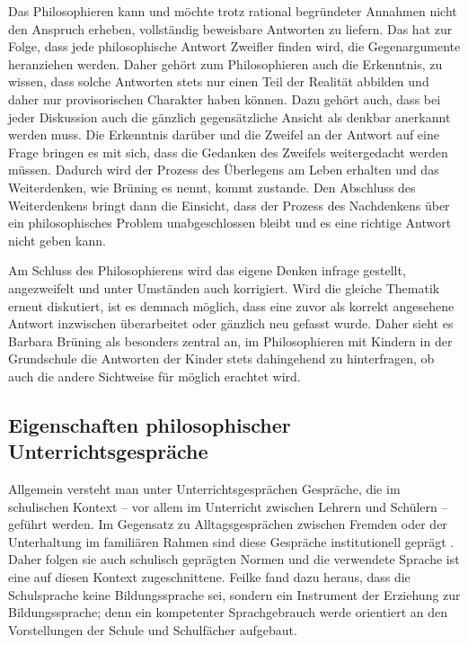 Das Philosophieren kann und möchte trotz rational begründeter Annahmen nicht den Anspruch erheben, vollständig beweisbare Antworten zu liefern. 
Das hat zur Folge, dass jede philosophische Antwort Zweifler finden wird, die Gegenargumente heranziehen werden. 
Daher gehört zum Philosophieren auch die Erkenntnis, zu wissen, dass solche Antworten stets nur einen Teil der Realität abbilden und daher nur provisorischen Charakter haben können. 
Dazu gehört auch, dass bei jeder Diskussion auch die gänzlich gegensätzliche Ansicht als denkbar anerkannt werden muss. 
Die Erkenntnis darüber und die Zweifel an der Antwort auf eine Frage bringen es mit sich, dass die Gedanken des Zweifels weitergedacht werden müssen. 
Dadurch wird der Prozess des Überlegens am Leben erhalten und das Weiterdenken, wie Brüning es nennt, kommt zustande. 
Den Abschluss des Weiterdenkens bringt dann die Einsicht, \glqq dass der Prozess des Nachdenkens über ein philosophisches Problem unabgeschlossen bleibt\grqq{} \cite[S.\,13]{BB10} und es eine \glqq richtige\grqq{} Antwort nicht geben kann.

Am Schluss des Philosophierens wird das eigene Denken infrage gestellt, angezweifelt und unter Umständen auch korrigiert. 
Wird die gleiche Thematik erneut diskutiert, ist es demnach möglich, dass eine zuvor als korrekt angesehene Antwort inzwischen überarbeitet oder gänzlich neu gefasst wurde. 
Daher sieht es Barbara Brüning als besonders zentral an, im Philosophieren mit Kindern in der Grundschule die Antworten der Kinder stets dahingehend zu hinterfragen, ob auch die andere Sichtweise für möglich erachtet wird.


\newpage
\subsection{Eigenschaften philosophischer Unterrichtsgespräche}

Allgemein versteht man unter Unterrichtsgesprächen Gespräche, die im schulischen Kontext -- vor allem im Unterricht zwischen Lehrern und Schülern -- geführt werden. 
Im Gegensatz zu Alltagsgesprächen zwischen Fremden oder der Unterhaltung im familiären Rahmen sind diese Gespräche \glqq institutionell geprägt\grqq{} \cite[S.\,28]{HB15}. 
Daher folgen sie auch schulisch geprägten Normen und die verwendete Sprache ist eine auf diesen Kontext zugeschnittene. 
Feilke fand dazu heraus, dass \glqq die Schulsprache keine Bildungssprache sei, sondern ein Instrument der Erziehung zur Bildungssprache; denn ein kompetenter Sprachgebrauch werde orientiert an den Vorstellungen der Schule und Schulfächer aufgebaut.\grqq{} \cite[S.\,117]{HF13}


